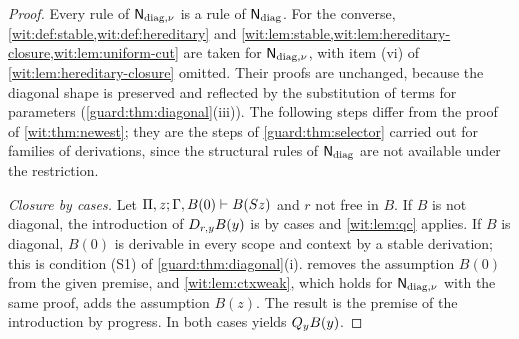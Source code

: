 \begin{proof}
Every rule of $\mathsf{N}_{\mathrm{diag},\nu}$ is a rule of
$\mathsf{N}_{\mathrm{diag}}$.  For the converse,
\cref{wit:def:stable,wit:def:hereditary} and
\cref{wit:lem:stable,wit:lem:hereditary-closure,wit:lem:uniform-cut} are
taken for $\mathsf{N}_{\mathrm{diag},\nu}$, with item (vi) of
\cref{wit:lem:hereditary-closure} omitted.  Their proofs are unchanged,
because the diagonal shape is preserved and reflected by the substitution
of terms for parameters (\cref{guard:thm:diagonal}(iii)).  The following
steps differ from the proof of \cref{wit:thm:newest}; they are the steps of
\cref{guard:thm:selector} carried out for families of derivations, since
the structural rules of $\mathsf{N}_{\mathrm{diag}}$ are not available under the
restriction.

\emph{Closure by cases.}  Let $\Pi,z;\Gamma,B(0)\vdash B(S z)$ and $r$
not free in $B$.  If $B$ is not diagonal, the introduction of
$D_{r,y}B(y)$ is by cases and \cref{wit:lem:qc} applies.  If $B$ is
diagonal, $B(0)$ is derivable in every scope and context by a stable
derivation; this is condition (S1) of \cref{guard:thm:diagonal}(i).
 removes the assumption $B(0)$ from the given
premise, and \cref{wit:lem:ctxweak}, which holds for
$\mathsf{N}_{\mathrm{diag},\nu}$ with the same proof, adds the assumption $B(z)$.
The result is the premise of the introduction by progress.  In both cases
 yields $Q_{y}B(y)$.


\end{proof}
